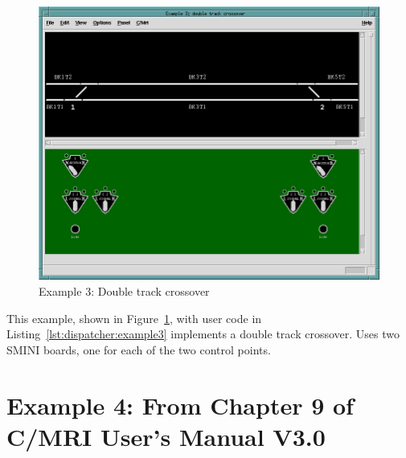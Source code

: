 \begin{figure}[hbpt]
\begin{centering}
\includegraphics[width=5in]{DISPExample3.png}
\caption{Example 3: Double track crossover}
\label{fig:dispatcher:example3}
\end{centering}
\end{figure}


This example, shown in Figure~\ref{fig:dispatcher:example3}, with user
code in Listing~\ref{lst:dispatcher:example3} implements a double track
crossover. Uses two SMINI boards, one for each of the two control points.

\section{Example 4: From Chapter 9 of C/MRI User's Manual V3.0}

